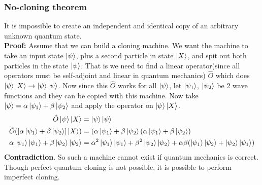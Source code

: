 \documentclass[11pt]{beamer}
\begin{document}
\begin{frame}
\frametitle{No-cloning theorem}
It is impossible to create an independent and identical copy of an arbitrary unknown quantum state.\\
\textbf{Proof:} Assume that we can build a cloning machine. We want the machine to take an input state $\ket{\psi}$, plus a second particle in state $\ket{X}$,
and spit out both particles in the state $\ket{\psi}$. That is we need to find a linear operator(since all operators must be self-adjoint and linear in quantum mechanics) $\hat{O}$ which does $\ket{\psi}\ket{X}\rightarrow \ket{\psi}\ket{\psi}$. Now since this $\hat{O}$ works for all $\ket{\psi}$, let $\ket{\psi_1}$, $\ket{\psi_2}$ be 2 wave functions and they can be copied with this machine. Now take $\ket{\psi}=\alpha\ket{\psi_1}+\beta\ket{\psi_2}$ and apply the operator on $\ket{\psi}\ket{X}$.
\begin{align*}
    \hat{O}\ket{\psi}\ket{X}&=\ket{\psi}\ket{\psi}\\
    \hat{O}([\alpha\ket{\psi_1}+\beta\ket{\psi_2}]\ket{X})&=(\alpha\ket{\psi_1}+\beta\ket{\psi_2}(\alpha\ket{\psi_1}+\beta\ket{\psi_2})\\
    \alpha\ket{\psi_1}\ket{\psi_1}+\beta\ket{\psi_2}\ket{\psi_2}&=\alpha^2\ket{\psi_1}\ket{\psi_1}+\beta^2\ket{\psi_2}\ket{\psi_2}+\alpha\beta(\ket{\psi_1}\ket{\psi_2}+\ket{\psi_2}\ket{\psi_1})
\end{align*}
\textbf{Contradiction}. So such a machine cannot exist if quantum mechanics is correct. Though perfect quantum cloning is not possible, it is possible to perform imperfect cloning.
\end{frame}
\end{document}

